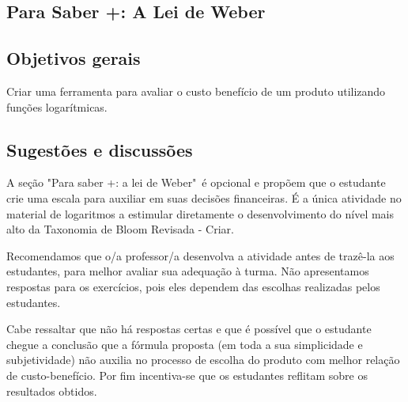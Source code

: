 \begin{texto}
{
	\section{Para Saber +: A Lei de Weber}
	\subsection{Objetivos gerais}
	Criar uma ferramenta para avaliar o custo benefício de um produto utilizando funções logarítmicas.


	\subsection{Sugestões e discussões}
	A seção "Para saber +: a lei de Weber"\, é opcional e propõem que o estudante crie uma escala para auxiliar em suas decisões financeiras. É a única atividade no material de logaritmos a estimular diretamente o desenvolvimento do nível mais alto da Taxonomia de Bloom Revisada - Criar.

	Recomendamos que o/a professor/a desenvolva a atividade antes de trazê-la aos estudantes, para  melhor avaliar sua adequação à turma. Não apresentamos respostas para os exercícios, pois eles dependem das escolhas realizadas pelos estudantes.

	Cabe ressaltar que não há respostas certas e que é possível que o estudante chegue a conclusão que a fórmula proposta (em toda a sua simplicidade e subjetividade) não auxilia no processo de escolha do produto com melhor relação de custo-benefício. Por fim incentiva-se que os estudantes reflitam sobre os resultados obtidos.
}
\end{texto}
\clearmargin
